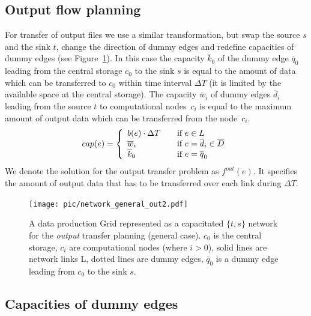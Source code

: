 \documentclass{svjour3}                     %
\begin{document}
\subsection{Output flow planning}
\label{outproblem}
For transfer of output files we use a similar transformation, but swap the
source $s$ and the sink $t$, change the direction of dummy edges and redefine
capacities of dummy edges (see Figure~\ref{general_out}). In this case the capacity $\overline{k}_{0}$ of the
dummy edge $\overline{q}_{0}$ leading from the central storage $c_0$ to the
sink $s$ is equal to the amount of data which can be transferred to $c_0$
within time interval $\Delta T$ (it is limited by the available space at the
central storage). The capacity $\overline{w}_{i}$ of dummy edges
$\overline{d}_{i}$ leading from the source $t$ to computational nodes~$c_{i}$
is equal to the maximum amount of output data which can be transferred from
the node~$c_{i}$.
%
\begin{equation}
\label{edge_cap_out}
cap(e) = \left\{ 
  \begin{array}{l l}
    b(e) \cdot \Delta T & \quad \text{if }e \in L \\
    \overline{w}_{i} & \quad \text{if } e = \overline{d}_{i} \in \overline{D}\\
    \overline{k}_{0} & \quad \text{if } e = \overline{q}_{0}
  \end{array} \right.
\end{equation}
%
We denote the solution for the output transfer problem as $f^{out}(e)$. It specifies the amount of output data that has to be transferred over each link during $\Delta T$.
\begin{figure}[t]
	\begin{center}
		\texttt{[image: pic/network\_general\_out2.pdf]}
	\end{center}
	\caption{A data production Grid represented as a capacitated $\{t,s\}$ network for the \textit{output} transfer planning (general case). $c_{0}$ is the central storage, $c_{i}$ are computational nodes (where $i>0$), solid lines are network links L, dotted lines are dummy edges, $\overline{q}_{0}$ is a dummy edge leading from $c_{0}$ to the sink $s$. }
	\label{general_out}	
\end{figure}

\subsection{Capacities of dummy edges}

\end{document}
